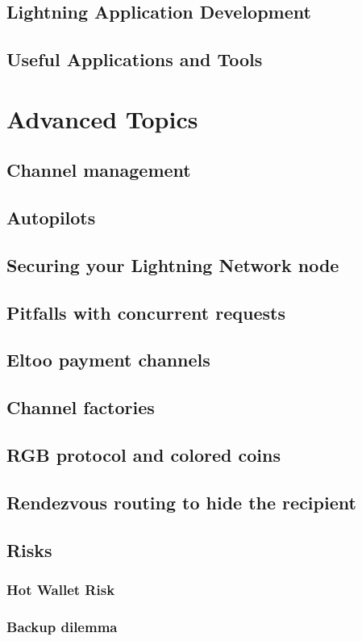 \documentclass[a4paper,12pt,oneside,openany]{book}
\begin{document}
\section{Lightning Application Development}
\section{Useful Applications and Tools}
\chapter{Advanced Topics}
\section{Channel management}
\section{Autopilots}
\section{Securing your Lightning Network node}
\section{Pitfalls with concurrent requests}
\section{Eltoo payment channels}
\section{Channel factories}
\section{RGB protocol and colored coins}
\section{Rendezvous routing to hide the recipient}
\section{Risks}
\subsection{Hot Wallet Risk}
\subsection{Backup dilemma}
\end{document}
